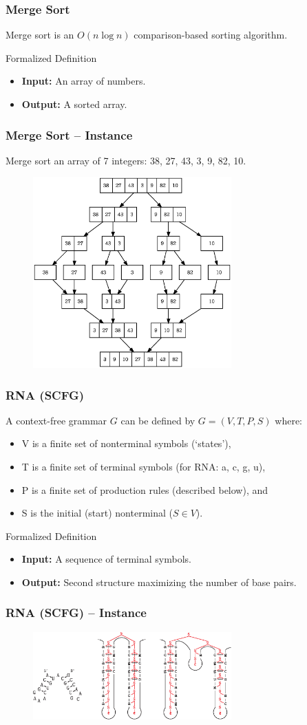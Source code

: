 \documentclass[slidestop,compress,mathserif]{beamer}
\begin{document}
\frame
{
  \frametitle{Merge Sort}
  Merge sort is an $O(n \log n)$ comparison-based sorting algorithm.
  \begin{block}{Formalized Definition}
  \begin{itemize}
  \item {\bf Input:} An array of numbers.
  \item {\bf Output:} A sorted array.
  \end{itemize}
  \end{block}
}
\frame
{
  \frametitle{Merge Sort -- Instance}
  Merge sort an array of 7 integers: 38, 27, 43, 3, 9, 82, 10.
  \begin{figure}
  \includegraphics[width=3in]{Merge_sort.eps}
  \end{figure}
}
\frame
{
  \frametitle{RNA (SCFG)}
  A context-free grammar $G$ can be defined by $G = (V, T, P, S)$ where:
  \begin{itemize}
  \item V is a finite set of nonterminal symbols (`states'),
  \item T is a finite set of terminal symbols (for RNA: {a, c, g, u}),
  \item P is a finite set of production rules (described below), and
  \item S is the initial (start) nonterminal ($S \in V$).
  \end{itemize}
  \begin{block}{Formalized Definition}
  \begin{itemize}
  \item {\bf Input:} A sequence of terminal symbols.
  \item {\bf Output:} Second structure maximizing the number of base pairs.
  \end{itemize}
  \end{block}
}
\frame
{
  \frametitle{RNA (SCFG) -- Instance}
  \begin{figure}
  \includegraphics[width=3in]{SCFG.eps}
  \end{figure}
}
\end{document}
